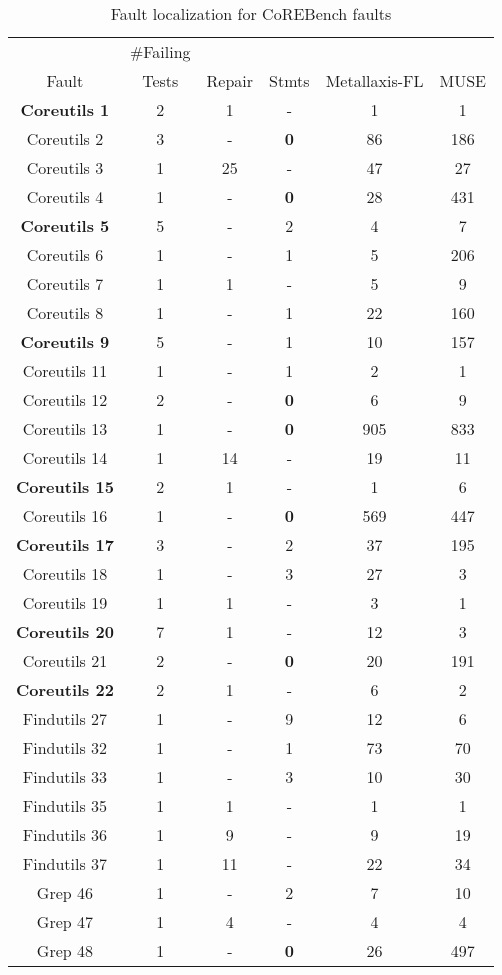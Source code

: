 \begin{table}
\caption{Fault localization for CoREBench faults}
\centering
{\scriptsize
\begin{tabular}{|c|c||c|c||c|c|}
\hline
& \#Failing & & & & \\
Fault & Tests & Repair & Stmts & Metallaxis-FL & MUSE\\
\hline
{\bf Coreutils 1} & 2 & 1 & - & 1 & 1 \\
Coreutils 2 & 3 & - &  {\bf 0} & 86 & 186 \\
Coreutils 3 & 1 & 25 & - & 47 & 27 \\
Coreutils 4 & 1 & - &  {\bf 0} & 28 & 431 \\
{\bf Coreutils 5} & 5 & - &  2 & 4 & 7 \\
Coreutils 6 & 1 & - &  1 & 5 & 206 \\
Coreutils 7 & 1 & 1 & - & 5 & 9 \\
Coreutils 8 & 1 & - &  1 & 22 & 160 \\
{\bf Coreutils 9} & 5 & - &  1 & 10 & 157 \\
Coreutils 11 & 1 & - &  1 & 2 & 1 \\
Coreutils 12 & 2 & - & {\bf 0} & 6 & 9 \\
Coreutils 13 & 1 & - & {\bf 0} & 905 & 833 \\
Coreutils 14 & 1 & 14 & - & 19 & 11 \\
{\bf Coreutils 15} & 2 & 1 & - & 1 & 6 \\
Coreutils 16 & 1 & - & {\bf 0} & 569 & 447 \\
{\bf Coreutils 17} & 3 & - &  2 & 37 & 195 \\
Coreutils 18 & 1 & - &  3 & 27 & 3 \\
Coreutils 19 & 1 & 1 & - & 3 & 1 \\
{\bf Coreutils 20} & 7 & 1 & - & 12 & 3 \\
Coreutils 21 & 2 & - & {\bf 0} & 20 & 191 \\
{\bf Coreutils 22} & 2 & 1 & - & 6 & 2 \\
Findutils 27 & 1 & - &  9 & 12 & 6 \\
Findutils 32 & 1 & - &  1 & 73 & 70 \\
Findutils 33 & 1 & - &  3 & 10 & 30 \\
Findutils 35 & 1 & 1 & - & 1 & 1 \\
Findutils 36 & 1 & 9 & - & 9 & 19 \\
Findutils 37 & 1 & 11 & - & 22 & 34 \\
Grep 46 & 1 & - &  2 & 7 & 10 \\
Grep 47 & 1 & 4 & - & 4 & 4 \\
Grep 48 & 1 & - & {\bf 0} & 26 & 497 \\

\hline
\end{tabular}
}
\label{otherbugs}
\end{table}